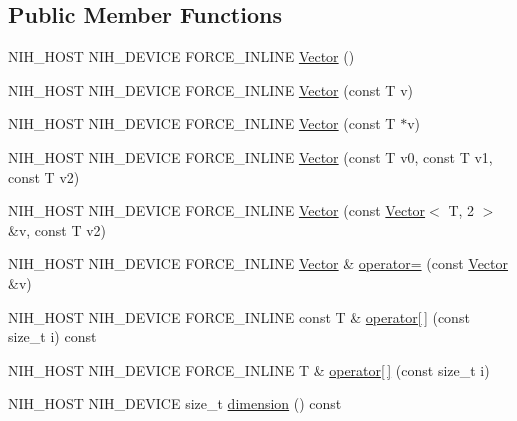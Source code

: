 \subsection*{\-Public \-Member \-Functions}
\begin{DoxyCompactItemize}
\item 
\-N\-I\-H\-\_\-\-H\-O\-S\-T \-N\-I\-H\-\_\-\-D\-E\-V\-I\-C\-E \-F\-O\-R\-C\-E\-\_\-\-I\-N\-L\-I\-N\-E \hyperlink{structnih_1_1_vector_3_01_t_00_013_01_4_a46f3c02e790ef9ede9362a4800abecf8}{\-Vector} ()
\item 
\-N\-I\-H\-\_\-\-H\-O\-S\-T \-N\-I\-H\-\_\-\-D\-E\-V\-I\-C\-E \-F\-O\-R\-C\-E\-\_\-\-I\-N\-L\-I\-N\-E \hyperlink{structnih_1_1_vector_3_01_t_00_013_01_4_a1fa5583b1b796dba60cf0c9fa7ca472d}{\-Vector} (const \-T v)
\item 
\-N\-I\-H\-\_\-\-H\-O\-S\-T \-N\-I\-H\-\_\-\-D\-E\-V\-I\-C\-E \-F\-O\-R\-C\-E\-\_\-\-I\-N\-L\-I\-N\-E \hyperlink{structnih_1_1_vector_3_01_t_00_013_01_4_ad44c24f5b05234e9cde8c07c0c070ca6}{\-Vector} (const \-T $\ast$v)
\item 
\-N\-I\-H\-\_\-\-H\-O\-S\-T \-N\-I\-H\-\_\-\-D\-E\-V\-I\-C\-E \-F\-O\-R\-C\-E\-\_\-\-I\-N\-L\-I\-N\-E \hyperlink{structnih_1_1_vector_3_01_t_00_013_01_4_a95ed63724e926d12ea0c47e5be1c5a72}{\-Vector} (const \-T v0, const \-T v1, const \-T v2)
\item 
\-N\-I\-H\-\_\-\-H\-O\-S\-T \-N\-I\-H\-\_\-\-D\-E\-V\-I\-C\-E \-F\-O\-R\-C\-E\-\_\-\-I\-N\-L\-I\-N\-E \hyperlink{structnih_1_1_vector_3_01_t_00_013_01_4_abb5a3d675c027f8f795883475f7c8c0b}{\-Vector} (const \hyperlink{structnih_1_1_vector}{\-Vector}$<$ \-T, 2 $>$ \&v, const \-T v2)
\item 
\-N\-I\-H\-\_\-\-H\-O\-S\-T \-N\-I\-H\-\_\-\-D\-E\-V\-I\-C\-E \*
\-F\-O\-R\-C\-E\-\_\-\-I\-N\-L\-I\-N\-E \hyperlink{structnih_1_1_vector}{\-Vector} \& \hyperlink{structnih_1_1_vector_3_01_t_00_013_01_4_a3bec2a9796b619173e3776b23a2f08b7}{operator=} (const \hyperlink{structnih_1_1_vector}{\-Vector} \&v)
\item 
\-N\-I\-H\-\_\-\-H\-O\-S\-T \-N\-I\-H\-\_\-\-D\-E\-V\-I\-C\-E \*
\-F\-O\-R\-C\-E\-\_\-\-I\-N\-L\-I\-N\-E const \-T \& \hyperlink{structnih_1_1_vector_3_01_t_00_013_01_4_af2d4000a3a863988f6e583eb30107d3f}{operator\mbox{[}$\,$\mbox{]}} (const size\-\_\-t i) const 
\item 
\-N\-I\-H\-\_\-\-H\-O\-S\-T \-N\-I\-H\-\_\-\-D\-E\-V\-I\-C\-E \*
\-F\-O\-R\-C\-E\-\_\-\-I\-N\-L\-I\-N\-E \-T \& \hyperlink{structnih_1_1_vector_3_01_t_00_013_01_4_a64ad5a39c5b1c9971b8dd7270f7a5710}{operator\mbox{[}$\,$\mbox{]}} (const size\-\_\-t i)
\item 
\-N\-I\-H\-\_\-\-H\-O\-S\-T \-N\-I\-H\-\_\-\-D\-E\-V\-I\-C\-E size\-\_\-t \hyperlink{structnih_1_1_vector_3_01_t_00_013_01_4_ac80e01ef9cbb7ff22bd61c8a84e20137}{dimension} () const 
\end{DoxyCompactItemize}
